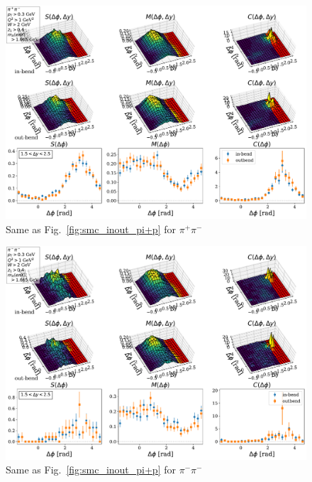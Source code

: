 \begin{figure}
    \centering
    \includegraphics[width=\textwidth]{images/smc_inout_pi+pi-.pdf}
    \caption{Same as Fig.~\ref{fig:smc_inout_pi+p} for $\pi^+\pi^-$}
    \label{fig:smc_inout_pi+pi-}
\end{figure}

\begin{figure}
    \centering
    \includegraphics[width=\textwidth]{images/smc_inout_pi-pi-.pdf}
    \caption{Same as Fig.~\ref{fig:smc_inout_pi+p} for $\pi^-\pi^-$}
    \label{fig:smc_inout_pi-pi-}
\end{figure}

